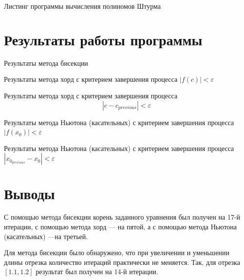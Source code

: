 Листинг программы вычисления полиномов Штурма
\lstset{inputencoding=utf8, extendedchars=\true}


\chapter{Результаты работы программы}

Результаты метода бисекции
\lstset{inputencoding=utf8, extendedchars=\true}


Результаты метода хорд с критерием завершения процесса $ \left| f \left( c \right) \right| < \varepsilon $
\lstset{inputencoding=utf8, extendedchars=\true}


Результаты метода хорд с критерием завершения процесса
$$\left| c - c_{previous} \right| < \varepsilon $$
\lstset{inputencoding=utf8, extendedchars=\true}


Результаты метода Ньютона (касательных) с критерием завершения процесса $ \left| f \left( x_0 \right) \right| < \varepsilon $
\lstset{inputencoding=utf8, extendedchars=\true}


Результаты метода Ньютона (касательных) с критерием завершения процесса $ \left| x_{0_{previous}} - x_0 \right| < \varepsilon $
\lstset{inputencoding=utf8, extendedchars=\true}


\chapter*{Выводы}

С помощью метода бисекции корень заданного уравнения был получен на 17-й итерации,
с помощью метода хорд --- на пятой,
а с помощью метода Ньютона (касательных) ---на третьей.

Для метода бисекции было обнаружено, что при увеличении и уменьшении длины отрезка количество итераций практически не меняется.
Так, для отрезка $ \left[ 1.1, 1.2 \right] $ результат был получен на 14-й итерации.

